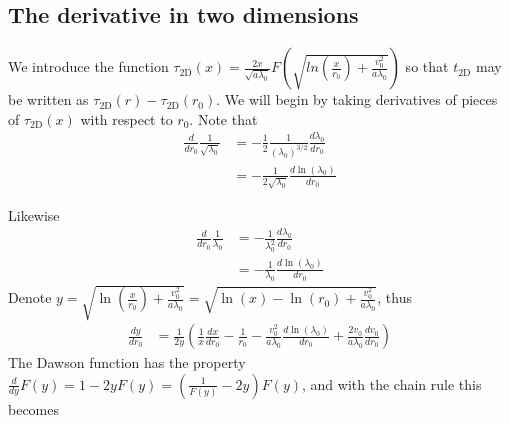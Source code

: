 \documentclass[aps,prl,twocolumn,showpacs,superscriptaddress,groupedaddress]{revtex4-1}  %
\begin{document}
\subsection{The derivative in two dimensions}
We introduce the function $\tau_\text{2D}(x) = \frac{2 x}{\sqrt{a \lambda_0}} F\left(\sqrt{ln\left(\frac{x}{r_0}\right) + \frac{v_0^2}{a \lambda_0}}\right)$ so
that $t_\text{2D}$ may be written as $\tau_\text{2D}(r) - \tau_\text{2D}(r_0)$.  We will begin by taking derivatives of pieces of $\tau_\text{2D}(x)$ 
with respect to $r_0$.  Note that 
\begin{align}
  \frac{d}{dr_0}\frac{1}{\sqrt{\lambda_0}} &= -\frac{1}{2}\frac{1}{(\lambda_0)^{3/2}} \frac{d\lambda_0}{d r_0}\nonumber\\
                                                                   &= -\frac{1}{2 \sqrt{\lambda_0}} \frac{d \ln(\lambda_0)}{d r_0}\label{eq:derivative sqrt a lambda_0}
 \end{align}
\begin{comment}
By the fundamental theorem of calculus and since $\lambda_0 = \int_0^{r_0} 2\pi \tilde{r} \rho_0(\tilde{r}) d\tilde{r}$, we get
$ \frac{d\lambda_0}{d r_0} = 2\pi r_0 \rho_0(r_0)$.  Thus, Eq. (\ref{eq:derivative sqrt a lambda_0}) becomes
\begin{align}
  \frac{d}{dr_0}\frac{1}{\sqrt{a \lambda_0}} &= -\frac{\pi r_0 \rho_0(r_0)}{\lambda_0} \frac{1}{\sqrt{a\lambda_0}}\label{eq:derivative sqrt a lambda_0 with rho}
\end{align}
\end{comment}
Likewise
\begin{align}
  \frac{d}{dr_0}\frac{1}{\lambda_0} &= -\frac{1}{\lambda_0^2} \frac{d\lambda_0}{d r_0}\nonumber\\
                                                          &= -\frac{1}{\lambda_0} \frac{d\ln(\lambda_0)}{d r_0}\label{eq:derivative a lambda_0 with rho}
\end{align}
Denote $y = \sqrt{\ln \left(\frac{x}{r_0}\right) + \frac{v_0^2}{a\lambda_0}} = \sqrt{\ln \left(x \right) - \ln\left({r_0}\right) + \frac{v_0^2}{a\lambda_0}}$, thus
\begin{align}
  \frac{dy}{dr_0} &= \frac{1}{2y} \left(\frac{1}{x} \frac{d x}{d r_0} - \frac{1}{r_0}  -  \frac{v_0^2}{a\lambda_0} \frac{d\ln(\lambda_0)}{d r_0} +   \frac{2 v_0}{a\lambda_0}\frac{d v_0}{d r_0}  \right)\label{eq:derivative 2D sqrt term} 
 \end{align}
 The Dawson function has the property $\frac{d}{dy} F(y) = 1 - 2 y F(y) = \left(\frac{1}{F(y)} - 2 y\right) F(y)$, and with the chain rule this becomes
\end{document}
